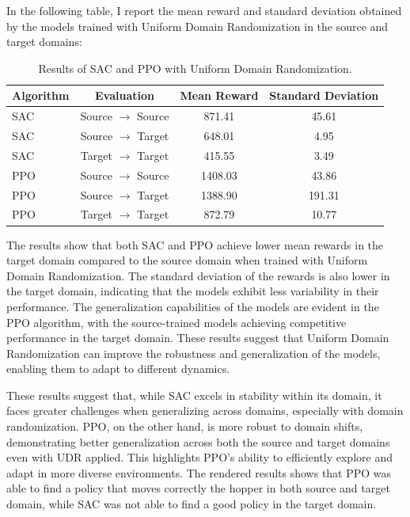 \documentclass[11pt]{article}
\begin{document}
In the following table, I report the mean reward and standard deviation obtained by the models trained with Uniform Domain Randomization in the source and target domains:

\begin{table}[H]
    \centering
    \begin{tabular}{|l|c|c|c|}
        \hline
        \textbf{Algorithm} & \textbf{Evaluation} & \textbf{Mean Reward} & \textbf{Standard Deviation} \\ \hline
        SAC & Source $\rightarrow$ Source & 871.41 & 45.61 \\ 
        SAC & Source $\rightarrow$ Target & 648.01 & 4.95 \\ 
        SAC & Target $\rightarrow$ Target & 415.55 & 3.49 \\ \hline
        PPO & Source $\rightarrow$ Source & 1408.03 & 43.86 \\ 
        PPO & Source $\rightarrow$ Target & 1388.90 & 191.31 \\ 
        PPO & Target $\rightarrow$ Target & 872.79 & 10.77 \\ \hline
    \end{tabular}
    \caption{Results of SAC and PPO with Uniform Domain Randomization.}
    \label{tab:results_udr}
\end{table}

The results show that both SAC and PPO achieve lower mean rewards in the target domain compared to the source domain when trained with Uniform Domain Randomization. The standard deviation of the rewards is also lower in the target domain, indicating that the models exhibit less variability in their performance. The generalization capabilities of the models are evident in the PPO algorithm, with the source-trained models achieving competitive performance in the target domain. These results suggest that Uniform Domain Randomization can improve the robustness and generalization of the models, enabling them to adapt to different dynamics.

These results suggest that, while SAC excels in stability within its domain, it faces greater challenges when generalizing across domains, especially with domain randomization. PPO, on the other hand, is more robust to domain shifts, demonstrating better generalization across both the source and target domains even with UDR applied. This highlights PPO’s ability to efficiently explore and adapt in more diverse environments. The rendered results shows that PPO was able to find a policy that moves correctly the hopper in both source and target domain, while SAC was not able to find a good policy in the target domain.
\end{document}
